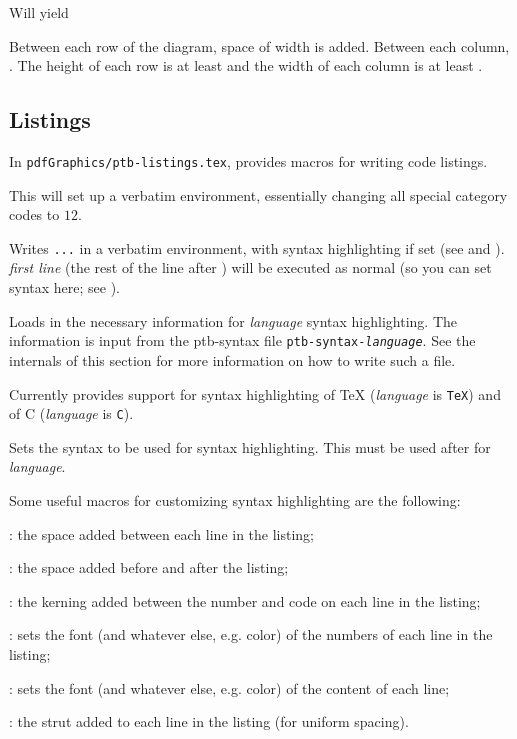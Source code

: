 Will yield

\centerline{}

Between each row of the diagram, space of width \macro\diagrowbuf{} is added.
Between each column, \macro\diagcolbuf.
The height of each row is at least \macro\diagrowheight{} and the width of each column is at least \macro\diagcolwidth.

\subsection{Listings}

In {\tt pdfGraphics/ptb-listings.tex}, \pdftoolbox{} provides macros for writing code listings.

\macroexp{\setupverb}
This will set up a verbatim environment, essentially changing all special category codes to $12$.
\emacroexp

Writes {\tt...} in a verbatim environment, with syntax highlighting if set (see \gotomacro\loadsyntax{} and \gotomacro\setsyntax).
{\it first line} (the rest of the line after \macro\blisting) will be executed as normal (so you can set syntax here; see \gotomacro\setsyntax).
\emacroexp

Loads in the necessary information for {\it language} syntax highlighting.
The information is input from the ptb-syntax file {\tt ptb-syntax-{\it language}}.
See the internals of this section for more information on how to write such a file.

Currently \pdftoolbox{} provides support for syntax highlighting of \TeX{} ({\it language} is {\tt TeX}) and of C ({\it language} is {\tt C}).
\emacroexp

Sets the syntax to be used for syntax highlighting.
This must be used after \macro\loadsyntax{} for {\it language}.
\emacroexp

Some useful macros for customizing syntax highlighting are the following:
\blist
    \item \macro\lstlineskip: the space added between each line in the listing;
    \item \macro\lstvbuf: the space added before and after the listing;
    \item \macro\lstlinenumbuf: the kerning added between the number and code on each line in the listing;
    \item \macro\lstnumfontset: sets the font (and whatever else, e.g. color) of the numbers of each line in the listing;
    \item \macro\lstfontset: sets the font (and whatever else, e.g. color) of the content of each line;
    \item \macro\lststrut: the strut added to each line in the listing (for uniform spacing).
\elist

